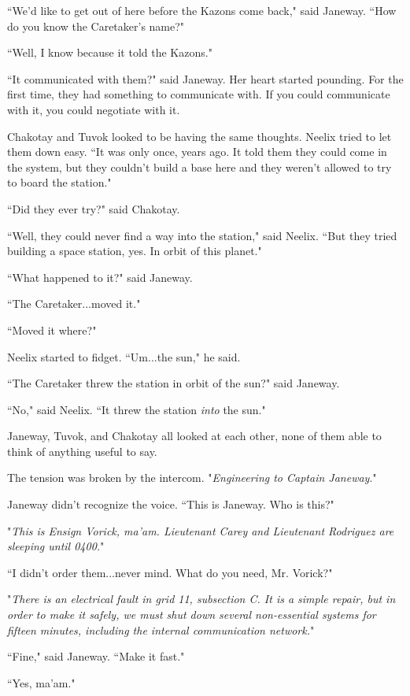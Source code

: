 \documentclass[twoside,letterpaper,12pt]{memoir}
\begin{document}
``We'd like to get out of here before the Kazons come back," said Janeway. ``How do you know the Caretaker's name?"

``Well, I know because it told the Kazons."

``It communicated with them?" said Janeway. Her heart started pounding. For the first time, they had something to communicate with. If you could communicate with it, you could negotiate with it.

Chakotay and Tuvok looked to be having the same thoughts. Neelix tried to let them down easy. ``It was only once, years ago. It told them they could come in the system, but they couldn't build a base here and they weren't allowed to try to board the station."

``Did they ever try?" said Chakotay.

``Well, they could never find a way into the station," said Neelix. ``But they tried building a space station, yes. In orbit of this planet."

``What happened to it?" said Janeway.

``The Caretaker...moved it."

``Moved it where?"

Neelix started to fidget. ``Um...the sun," he said.

``The Caretaker threw the station in orbit of the sun?" said Janeway.

``No," said Neelix. ``It threw the station \textit{into} the sun."

Janeway, Tuvok, and Chakotay all looked at each other, none of them able to think of anything useful to say.

The tension was broken by the intercom. "\textit{Engineering to Captain Janeway}."

Janeway didn't recognize the voice. ``This is Janeway. Who is this?"

"\textit{This is Ensign Vorick, ma'am. Lieutenant Carey and Lieutenant Rodriguez are sleeping until 0400.}"

``I didn't order them...never mind. What do you need, Mr. Vorick?"

"\textit{There is an electrical fault in grid 11, subsection C. It is a simple repair, but in order to make it safely, we must shut down several non-essential systems for fifteen minutes, including the internal communication network.}"

``Fine," said Janeway. ``Make it fast."

``Yes, ma'am."
\end{document}
